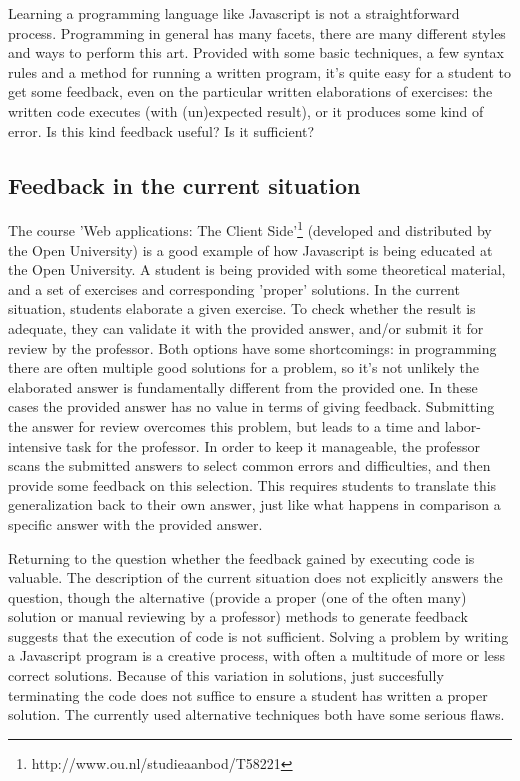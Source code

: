 \documentclass{article}
\begin{document}
Learning a programming language like Javascript is not a straightforward
process. Programming in general has many facets, there are many different
styles and ways to perform this art. Provided with some basic techniques, a few
syntax rules and a method for running a written program, it's quite easy for a
student to get some feedback, even on the particular written elaborations of
exercises: the written code executes (with (un)expected result), or it produces
some kind of error. Is this kind feedback useful? Is it sufficient?

\subsection{Feedback in the current situation} 

The course 'Web applications: The Client
Side'\footnote{http://www.ou.nl/studieaanbod/T58221} (developed and distributed
by the Open University) is a good example of how Javascript is being educated
at the Open University. A student is being provided with some theoretical
material, and a set of exercises and corresponding 'proper' solutions. In the
current situation, students elaborate a given exercise. To check whether the
result is adequate, they can validate it with the provided answer, and/or
submit it for review by the professor. Both options have some shortcomings: in
programming there are often multiple good solutions for a problem, so it’s not
unlikely the elaborated answer is fundamentally different from the provided
one. In these cases the provided answer has no value in terms of giving
feedback. Submitting the answer for review overcomes this problem, but leads to
a time and labor-intensive task for the professor. In order to keep it
manageable, the professor scans the submitted answers to select common errors
and difficulties, and then provide some feedback on this selection. This
requires students to translate this generalization back to their own answer,
just like what happens in comparison a specific answer with the provided
answer.

Returning to the question whether the feedback gained by executing code is 
valuable. The description of the current situation does not explicitly answers 
the question, though the alternative (provide a proper (one of the often 
many) solution or manual reviewing by a professor) methods to generate
feedback suggests that the execution of code is not sufficient. 
Solving a problem by writing a Javascript program is a creative process, 
with often a multitude of more or less correct solutions. Because of 
this variation in solutions, just succesfully terminating the code does 
not suffice to ensure a student has written a proper solution. 
The currently used alternative techniques both have some serious flaws. 
\end{document}
